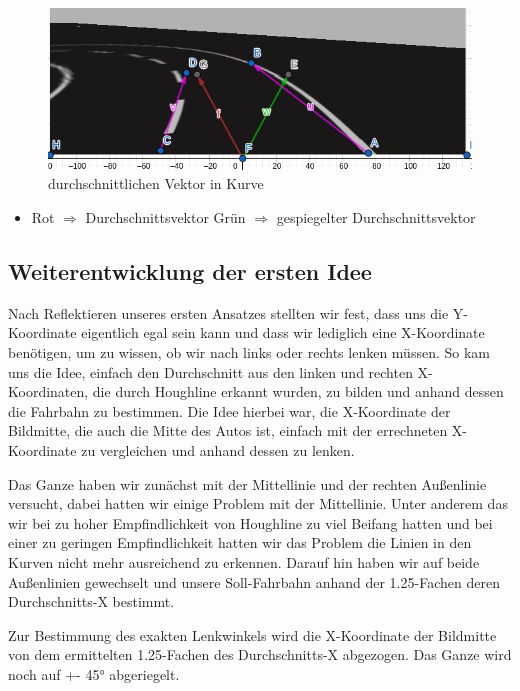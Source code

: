 \begin{figure}[H]
	\centering	
	\includegraphics[width=.5\textwidth]{img/vector_kurve}
	\caption[durchschnittlichen Vektor in Kurve]{durchschnittlichen Vektor in Kurve}
	\label{fig:vector_kurve}
\end{figure}

\begin{itemize}
			\item \color{red} Rot $\Rightarrow$ Durchschnittsvektor 	\qquad \color{green} Grün $\Rightarrow$ gespiegelter Durchschnittsvektor
			
\end{itemize}



\subsection{Weiterentwicklung der ersten Idee}
Nach Reflektieren unseres ersten Ansatzes stellten wir fest, dass uns die Y-Koordinate eigentlich egal sein kann und dass wir lediglich eine X-Koordinate benötigen, um zu wissen, ob wir nach links oder rechts lenken müssen. So kam uns die Idee, einfach den Durchschnitt aus den linken und rechten X-Koordinaten, die durch Houghline erkannt wurden, zu bilden und anhand dessen die Fahrbahn zu bestimmen. Die Idee hierbei war, die X-Koordinate der Bildmitte, die auch die Mitte des Autos ist, einfach mit der errechneten X-Koordinate zu vergleichen und anhand dessen zu lenken.

Das Ganze haben wir zunächst mit der Mittellinie und der rechten Außenlinie versucht, dabei hatten wir einige Problem mit der Mittellinie. Unter anderem das wir bei zu hoher Empfindlichkeit von Houghline zu viel Beifang hatten und bei einer zu geringen Empfindlichkeit hatten wir das Problem die Linien in den Kurven nicht mehr ausreichend zu erkennen. Darauf hin haben wir auf beide Außenlinien gewechselt und unsere Soll-Fahrbahn anhand der 1.25-Fachen deren Durchschnitts-X bestimmt.

Zur Bestimmung des exakten Lenkwinkels wird die X-Koordinate der Bildmitte von dem ermittelten 1.25-Fachen des Durchschnitts-X abgezogen. Das Ganze wird noch auf +- 45° abgeriegelt.

